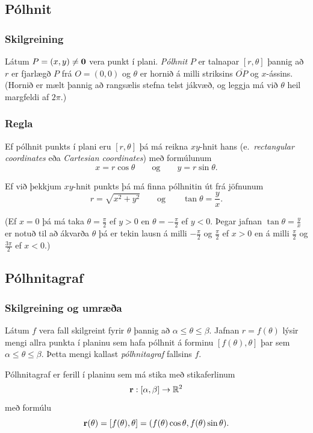 \subsection{Pólhnit} 

\subsubsection{Skilgreining }
Látum $P=(x,y)\neq \mbox{${\bf 0}$}$ vera punkt í plani.  {\em Pólhnit} $P$ er talnapar $[r,\theta]$ þannig að $r$ er fjarlægð $P$ frá 
$O=(0,0)$ og $\theta$ er hornið á milli striksins $\overline{OP}$ og $x$-ássins.  (Hornið er mælt þannig að rangsælis stefna telst jákvæð,  og leggja má við $\theta$ heil margfeldi af $2\pi$.)



\subsubsection{Regla }
  Ef pólhnit punkts í plani eru $[r, \theta]$ þá má reikna $xy$-hnit hans (e.~{\em rectangular coordinates} eða {\em Cartesian coordinates}) með formúlunum
$$x=r\cos\theta \qquad\mbox{og}\qquad y=r\sin\theta.$$

Ef við þekkjum $xy$-hnit punkts þá má finna pólhnitin út frá jöfnunum
$$r=\sqrt{x^2+y^2}\qquad\mbox{og}
\qquad \tan\theta=\frac{y}{x}.$$

(Ef $x=0$ þá má taka $\theta=\frac{\pi}{2}$ ef $y>0$ en 
$\theta=-\frac{\pi}{2}$ ef $y<0$.  Þegar jafnan $\tan\theta=\frac{y}{x}$ er notuð til að ákvarða $\theta$ þá er tekin lausn á milli $-\frac{\pi}{2}$  og $\frac{\pi}{2}$ ef $x>0$ en á milli $\frac{\pi}{2}$ og $\frac{3\pi}{2}$ ef $x<0$.)



\subsection{Pólhnitagraf}
\subsubsection {Skilgreining og umræða }
Látum $f$ vera fall skilgreint fyrir 
$\theta$ þannig að 
$\alpha\leq\theta\leq\beta$.  Jafnan $r=f(\theta)$ lýsir mengi allra punkta í planinu sem hafa pólhnit á forminu $[f(\theta),\theta]$ þar sem $\alpha\leq\theta\leq\beta$.  Þetta mengi kallast {\em pólhnitagraf} fallsins $f$.

Pólhnitagraf er ferill í planinu sem má stika með stikaferlinum 
$$\mbox{${\bf r}$}:[\alpha,\beta]\rightarrow{\mathbb R}^2$$
með formúlu
$$\mbox{${\bf r}$}(\theta)=[f(\theta),\theta]=
(f(\theta)\cos\theta, f(\theta)\sin\theta).$$
 


